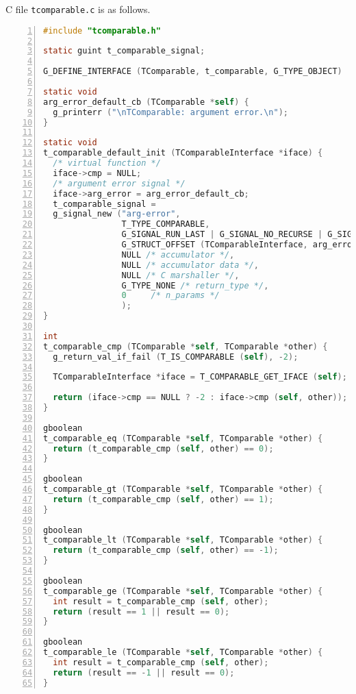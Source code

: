 C file \passthrough{\lstinline!tcomparable.c!} is as follows.

\begin{lstlisting}[language=C, numbers=left]
#include "tcomparable.h"

static guint t_comparable_signal;

G_DEFINE_INTERFACE (TComparable, t_comparable, G_TYPE_OBJECT)

static void
arg_error_default_cb (TComparable *self) {
  g_printerr ("\nTComparable: argument error.\n");
}

static void
t_comparable_default_init (TComparableInterface *iface) {
  /* virtual function */
  iface->cmp = NULL;
  /* argument error signal */
  iface->arg_error = arg_error_default_cb;
  t_comparable_signal =
  g_signal_new ("arg-error",
                T_TYPE_COMPARABLE,
                G_SIGNAL_RUN_LAST | G_SIGNAL_NO_RECURSE | G_SIGNAL_NO_HOOKS,
                G_STRUCT_OFFSET (TComparableInterface, arg_error),
                NULL /* accumulator */,
                NULL /* accumulator data */,
                NULL /* C marshaller */,
                G_TYPE_NONE /* return_type */,
                0     /* n_params */
                );
}

int
t_comparable_cmp (TComparable *self, TComparable *other) {
  g_return_val_if_fail (T_IS_COMPARABLE (self), -2);

  TComparableInterface *iface = T_COMPARABLE_GET_IFACE (self);
  
  return (iface->cmp == NULL ? -2 : iface->cmp (self, other));
}

gboolean
t_comparable_eq (TComparable *self, TComparable *other) {
  return (t_comparable_cmp (self, other) == 0);
}

gboolean
t_comparable_gt (TComparable *self, TComparable *other) {
  return (t_comparable_cmp (self, other) == 1);
}

gboolean
t_comparable_lt (TComparable *self, TComparable *other) {
  return (t_comparable_cmp (self, other) == -1);
}

gboolean
t_comparable_ge (TComparable *self, TComparable *other) {
  int result = t_comparable_cmp (self, other);
  return (result == 1 || result == 0);
}

gboolean
t_comparable_le (TComparable *self, TComparable *other) {
  int result = t_comparable_cmp (self, other);
  return (result == -1 || result == 0);
}
\end{lstlisting}


